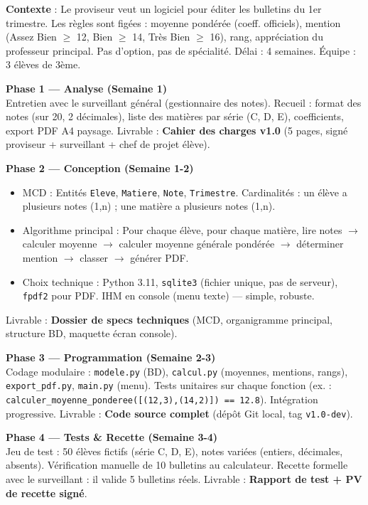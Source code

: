 \documentclass[11pt]{article}
\begin{document}
\begin{exemplebox}
\textbf{Contexte} : Le proviseur veut un logiciel pour éditer les bulletins du 1er trimestre. Les règles sont figées : moyenne pondérée (coeff. officiels), mention (Assez Bien $\ge$ 12, Bien $\ge$ 14, Tr\`es Bien $\ge$ 16), rang, appréciation du professeur principal. Pas d'option, pas de spécialité. Délai : 4 semaines. Équipe : 3 élèves de 3ème.

\textbf{Phase 1 — Analyse (Semaine 1)} \\
Entretien avec le surveillant général (gestionnaire des notes). Recueil : format des notes (sur 20, 2 décimales), liste des matières par série (C, D, E), coefficients, export PDF A4 paysage. Livrable : \textbf{Cahier des charges v1.0} (5 pages, signé proviseur + surveillant + chef de projet élève).

\textbf{Phase 2 — Conception (Semaine 1-2)} \\
\begin{itemize}
    \item MCD : Entités \texttt{Eleve}, \texttt{Matiere}, \texttt{Note}, \texttt{Trimestre}. Cardinalités : un élève a plusieurs notes (1,n) ; une matière a plusieurs notes (1,n).
    \item Algorithme principal : Pour chaque élève, pour chaque matière, lire notes $\rightarrow$ calculer moyenne $\rightarrow$ calculer moyenne générale pondérée $\rightarrow$ déterminer mention $\rightarrow$ classer $\rightarrow$ générer PDF.
    \item Choix technique : Python 3.11, \texttt{sqlite3} (fichier unique, pas de serveur), \texttt{fpdf2} pour PDF. IHM en console (menu texte) — simple, robuste.
\end{itemize}
Livrable : \textbf{Dossier de specs techniques} (MCD, organigramme principal, structure BD, maquette écran console).

\textbf{Phase 3 — Programmation (Semaine 2-3)} \\
Codage modulaire : \texttt{modele.py} (BD), \texttt{calcul.py} (moyennes, mentions, rangs), \texttt{export\_pdf.py}, \texttt{main.py} (menu). Tests unitaires sur chaque fonction (ex. : \texttt{calculer\_moyenne\_ponderee([(12,3),(14,2)]) == 12.8}). Intégration progressive. Livrable : \textbf{Code source complet} (dépôt Git local, tag \texttt{v1.0-dev}).

\textbf{Phase 4 — Tests \& Recette (Semaine 3-4)} \\
Jeu de test : 50 élèves fictifs (série C, D, E), notes variées (entiers, décimales, absents). Vérification manuelle de 10 bulletins au calculateur. Recette formelle avec le surveillant : il valide 5 bulletins réels. Livrable : \textbf{Rapport de test + PV de recette signé}.


\end{exemplebox}
\end{document}
